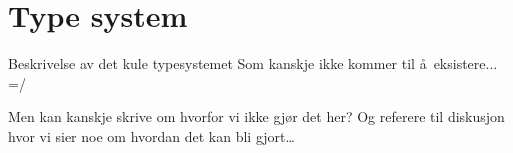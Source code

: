 \section{Type system}
\label{sect:type_system}
Beskrivelse av det kule typesystemet Som kanskje ikke kommer til \aa~eksistere... =/

Men kan kanskje skrive om hvorfor vi ikke gj\o r det her? Og referere til diskusjon hvor vi sier noe om hvordan
det kan bli gjort\ldots
